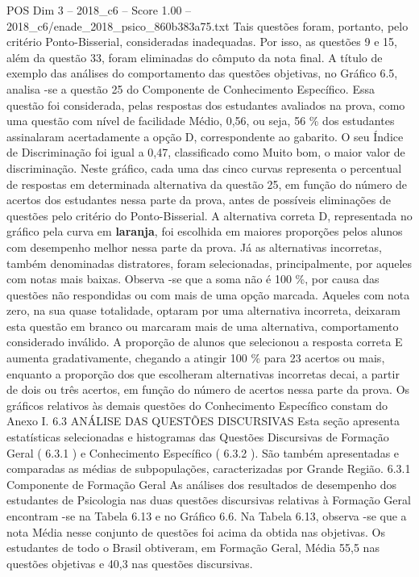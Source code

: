 \begin{textsample}{POS Dim 3 – 2018\_c6 – Score 1.00 – 2018\_c6/enade\_2018\_psico\_860b383a75.txt}
Tais questões foram, portanto, pelo critério Ponto-Bisserial, consideradas inadequadas.
Por isso, as questões 9 e 15, além da questão 33, foram eliminadas do cômputo da nota final.
A título de exemplo das análises do comportamento das questões objetivas, no Gráfico 6.5, analisa -se a questão 25 do Componente de Conhecimento Específico.
Essa questão foi considerada, pelas respostas dos estudantes avaliados na prova, como uma questão com nível de facilidade Médio, 0,56, ou seja, 56 \% dos estudantes assinalaram acertadamente a opção D, correspondente ao gabarito.
O seu Índice de Discriminação foi igual a 0,47, classificado como Muito bom, o maior valor de discriminação.
Neste gráfico, cada uma das cinco curvas representa o percentual de respostas em determinada alternativa da questão 25, em função do número de acertos dos estudantes nessa parte da prova, antes de possíveis eliminações de questões pelo critério do Ponto-Bisserial.
A alternativa correta D, representada no gráfico pela curva em \textbf{laranja}, foi escolhida em maiores proporções pelos alunos com desempenho melhor nessa parte da prova.
Já as alternativas incorretas, também denominadas distratores, foram selecionadas, principalmente, por aqueles com notas mais baixas.
Observa -se que a soma não é 100 \%, por causa das questões não respondidas ou com mais de uma opção marcada.
Aqueles com nota zero, na sua quase totalidade, optaram por uma alternativa incorreta, deixaram esta questão em branco ou marcaram mais de uma alternativa, comportamento considerado inválido.
A proporção de alunos que selecionou a resposta correta E aumenta gradativamente, chegando a atingir 100 \% para 23 acertos ou mais, enquanto a proporção dos que escolheram alternativas incorretas decai, a partir de dois ou três acertos, em função do número de acertos nessa parte da prova.
Os gráficos relativos às demais questões do Conhecimento Específico constam do Anexo I. 6.3 ANÁLISE DAS QUESTÕES DISCURSIVAS Esta seção apresenta estatísticas selecionadas e histogramas das Questões Discursivas de Formação Geral ( 6.3.1 ) e Conhecimento Específico ( 6.3.2 ).
São também apresentadas e comparadas as médias de subpopulações, caracterizadas por Grande Região. 6.3.1 Componente de Formação Geral As análises dos resultados de desempenho dos estudantes de Psicologia nas duas questões discursivas relativas à Formação Geral encontram -se na Tabela 6.13 e no Gráfico 6.6.
Na Tabela 6.13, observa -se que a nota Média nesse conjunto de questões foi acima da obtida nas objetivas.
Os estudantes de todo o Brasil obtiveram, em Formação Geral, Média 55,5 nas questões objetivas e 40,3 nas questões discursivas.

\end{textsample}
